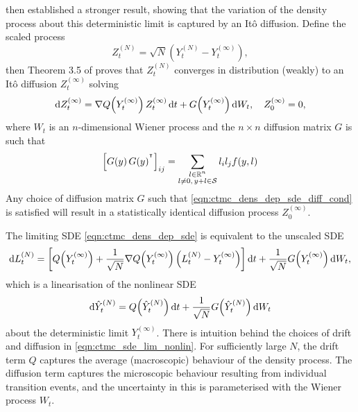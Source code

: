 \citet{Kurtz_1971_LimitTheoremsSequences} then established a stronger result, showing that the variation of the density process about this deterministic limit is captured by an It\^o diffusion.
Define the scaled process
\[
	Z_t^{(N)} = \sqrt{N}\left(Y_t^{(N)} - Y_{t}^{(\infty)}\right),
\]
then Theorem 3.5 of \citet{Kurtz_1971_LimitTheoremsSequences} proves that \(Z_t^{(N)}\) converges in distribution (weakly) to an It\^o diffusion \(Z_t^{(\infty)}\) solving
\begin{equation}
	\dif Z_t^{(\infty)} = \nabla Q\!\left(Y_t^{(\infty)}\right) Z_t^{(\infty)}\dif t + G\!\left(Y_t^{(\infty)}\right)\dif W_t, \quad Z_0^{(\infty)} = 0,
	\label{eqn:ctmc_dens_dep_sde}
\end{equation}
where \(W_t\) is an \(n\)-dimensional Wiener process and the \(n \times n\) diffusion matrix \(G\) is such that
\begin{equation}
	\left[G\!\left(y\right)G\!\left(y\right)^{^{\intercal}}\right]_{ij} = \sum_{\substack{l \in \mathbb{R}^n \\ l \neq 0,\, y + l \in \mathcal{S}}}{l_i l_j f\!\left(y,l\right)}
	\label{eqn:ctmc_dens_dep_sde_diff_cond}
\end{equation}
Any choice of diffusion matrix \(G\) such that \eqref{eqn:ctmc_dens_dep_sde_diff_cond} is satisfied will result in a statistically identical diffusion process \(Z_0^{(\infty)}\).

The limiting SDE \eqref{eqn:ctmc_dens_dep_sde} is equivalent to the unscaled SDE
\begin{equation}
	\dif L_t^{(N)} = \left[Q\!\left(Y_t^{(\infty)}\right) + \frac{1}{\sqrt{N}} \nabla Q\!\left(Y_t^{(\infty)}\right)\left(L_t^{(N)} - Y_t^{(\infty)}\right)\right]\dif t + \frac{1}{\sqrt{N}}G\!\left(Y_t^{(\infty)}\right)\dif W_t,
	\label{eqn:ctmc_sde_lin_lim}
\end{equation}
which is a linearisation of the nonlinear SDE
\begin{equation}
	\dif \hat{Y}^{(N)}_t = Q\!\left(\hat{Y}^{(N)}_t\right)\dif t + \frac{1}{\sqrt{N}}G\!\left(\hat{Y}_t^{(N)}\right)\dif W_t
	\label{eqn:ctmc_sde_lim_nonlin}
\end{equation}
about the deterministic limit \(Y_t^{(\infty)}\).
There is intuition behind the choices of drift and diffusion in \cref{eqn:ctmc_sde_lim_nonlin}.
For sufficiently large \(N\), the drift term \(Q\) captures the average (macroscopic) behaviour of the density process.
The diffusion term captures the microscopic behaviour resulting from individual transition events, and the uncertainty in this is parameterised with the Wiener process \(W_t\).




